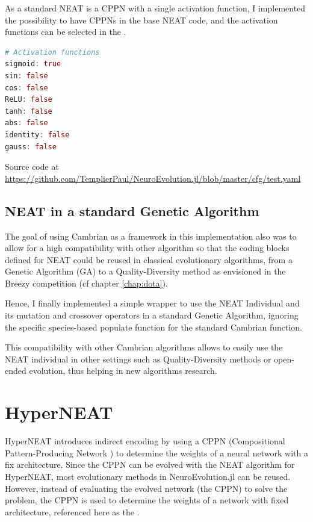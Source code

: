 As a standard NEAT is a CPPN with a single activation function, I implemented the possibility to have CPPNs in the base NEAT code, and the activation functions can be selected in the .

\begin{minipage}{\linewidth}
\begin{lstlisting}[language=Julia, caption=Available activation functions in my implementation]
# Activation functions
sigmoid: true
sin: false
cos: false
ReLU: false
tanh: false
abs: false
identity: false
gauss: false
\end{lstlisting}
Source code at \url{https://github.com/TemplierPaul/NeuroEvolution.jl/blob/master/cfg/test.yaml}\\
\end{minipage}

\subsection{NEAT in a standard Genetic Algorithm}
\label{sec:neat-ga}

The goal of using Cambrian as a framework in this implementation also was to allow for a high compatibility with other algorithm so that the coding blocks defined for NEAT could be reused in classical evolutionary algorithms, from a Genetic Algorithm (GA) to a Quality-Diversity method as envisioned in the Breezy competition (cf chapter \ref{chap:dota}). 

Hence, I finally implemented a simple wrapper to use the NEAT Individual and its mutation and crossover operators in a standard Genetic Algorithm, ignoring the specific species-based populate function for the standard Cambrian  function.

This compatibility with other Cambrian algorithms allows to easily use the NEAT individual in other settings such as Quality-Diversity methods or open-ended evolution, thus helping in new algorithms research.

\section{HyperNEAT}
HyperNEAT \cite{HyperNEAT} introduces indirect encoding by using a CPPN (Compositional Pattern-Producing Network \cite{CPPN}) to determine the weights of a neural network with a fix architecture. Since the CPPN can be evolved with the NEAT algorithm for HyperNEAT, most evolutionary methods in NeuroEvolution.jl can be reused. \\ 
However, instead of evaluating the evolved network (the CPPN) to solve the problem, the CPPN is used to determine the weights of a network with fixed architecture, referenced here as the . 

